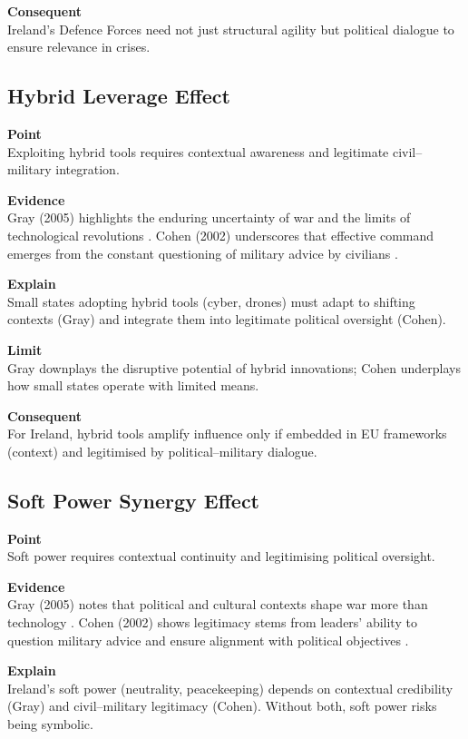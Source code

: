 \textbf{Consequent} \\
Ireland’s Defence Forces need not just structural agility but political dialogue to ensure relevance in crises.  

\subsection*{Hybrid Leverage Effect}

\textbf{Point} \\
Exploiting hybrid tools requires contextual awareness and legitimate civil--military integration.

\textbf{Evidence} \\
Gray (2005) highlights the enduring uncertainty of war and the limits of technological revolutions \parencite{GRAY_2005}.  
Cohen (2002) underscores that effective command emerges from the constant questioning of military advice by civilians \parencite{COHEN_2002}.  

\textbf{Explain} \\
Small states adopting hybrid tools (cyber, drones) must adapt to shifting contexts (Gray) and integrate them into legitimate political oversight (Cohen).

\textbf{Limit} \\
Gray downplays the disruptive potential of hybrid innovations; Cohen underplays how small states operate with limited means.

\textbf{Consequent} \\
For Ireland, hybrid tools amplify influence only if embedded in EU frameworks (context) and legitimised by political--military dialogue.  

\subsection*{Soft Power Synergy Effect}

\textbf{Point} \\
Soft power requires contextual continuity and legitimising political oversight.

\textbf{Evidence} \\
Gray (2005) notes that political and cultural contexts shape war more than technology \parencite{GRAY_2005}.  
Cohen (2002) shows legitimacy stems from leaders’ ability to question military advice and ensure alignment with political objectives \parencite{COHEN_2002}.  

\textbf{Explain} \\
Ireland’s soft power (neutrality, peacekeeping) depends on contextual credibility (Gray) and civil--military legitimacy (Cohen). Without both, soft power risks being symbolic.

